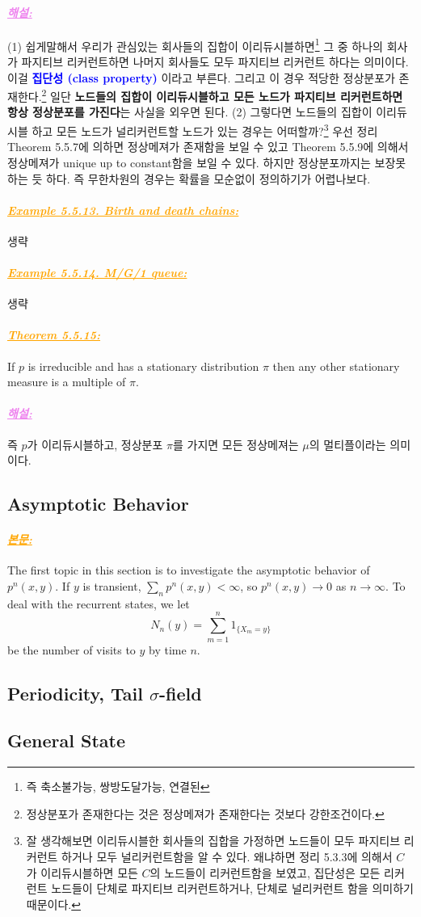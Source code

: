 \documentclass[12pt,oneside,english,a4paper]{article}
\newcommand{\paraviolet}[1]{\paragraph{\LARGE\textcolor{violet}{\it\underline{\textbf{#1:}}}}\LARGE}
\newcommand{\paraorange}[1]{\paragraph{\LARGE\textcolor{orange}{\it\underline{\textbf{#1:}}}}\LARGE}
\begin{document}
\paraviolet{해설} (1) 쉽게말해서 우리가 관심있는 회사들의 집합이 이리듀시블하면\footnote{즉 축소불가능, 쌍방도달가능, 연결된} 그 중 하나의 회사가 파지티브 리커런트하면 나머지 회사들도 모두 파지티브 리커런트 하다는 의미이다. 이걸 \textcolor{blue}{\bf 집단성 (class property)} 이라고 부른다. 그리고 이 경우 적당한 정상분포가 존재한다.\footnote{정상분포가 존재한다는 것은 정상메져가 존재한다는 것보다 강한조건이다.} 일단 {\bf 노드들의 집합이 이리듀시블하고 모든 노드가 파지티브 리커런트하면 항상 정상분포를 가진다}는 사실을 외우면 된다. (2) 그렇다면 노드들의 집합이 이리듀시블 하고 모든 노드가 널리커런트할 노드가 있는 경우는 어떠할까?\footnote{잘 생각해보면 이리듀시블한 회사들의 집합을 가정하면 노드들이 모두 파지티브 리커런트 하거나 모두 널리커런트함을 알 수 있다. 왜냐하면 정리 5.3.3에 의해서 $C$가 이리듀시블하면 모든 $C$의 노드들이 리커런트함을 보였고, 집단성은 모든 리커런트 노드들이 단체로 파지티브 리커런트하거나, 단체로 널리커런트 함을 의미하기 때문이다.} 우선 정리 Theorem 5.5.7에 의하면 정상메져가 존재함을 보일 수 있고 Theorem 5.5.9에 의해서 정상메져가 unique up to constant함을 보일 수 있다. 하지만 정상분포까지는 보장못하는 듯 하다. 즉 무한차원의 경우는 확률을 모순없이 정의하기가 어렵나보다. 

\paraorange{Example 5.5.13. Birth and death chains} 생략 

\paraorange{Example 5.5.14. M/G/1 queue} 생략 

\paraorange{Theorem 5.5.15} If $p$ is irreducible and has a stationary distribution $\pi$ then any other stationary measure is a multiple of $\pi$.

\paraviolet{해설} 즉 $p$가 이리듀시블하고, 정상분포 $\pi$를 가지면 모든 정상메져는 $\mu$의 멀티플이라는 의미이다. 


\subsection{Asymptotic Behavior}

\paraorange{본문} The first topic in this section is to investigate the asymptotic behavior of $p^n(x,y)$. If $y$ is transient, $\sum_n p^n(x,y)<\infty$, so $p^n(x,y)\to 0$ as $n\to \infty$. To deal with the recurrent states, we let
\[
N_n(y)=\sum_{m=1}^{n}1_{\{X_m=y\}}
\]
be the number of visits to $y$ by time $n$.

\subsection{Periodicity, Tail $\sigma$-field}

\subsection{General State}
\end{document}
